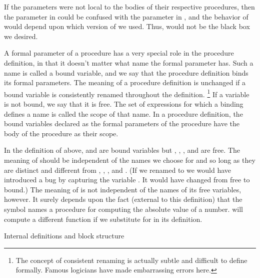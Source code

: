 If the parameters were not local to the bodies of their respective procedures,
then the parameter  in  could be confused with the parameter  in ,
and the behavior of  would depend upon which version of  we used.
Thus,  would not be the black box we desired.

A formal parameter of a procedure has a very special role in the procedure definition,
in that it doesn't matter what name the formal parameter has.
Such a name is called a bound variable, and we say that the procedure definition binds its formal parameters.
The meaning of a procedure definition is unchanged
if a bound variable is consistently renamed throughout the definition.
\footnote{%
   The concept of consistent renaming is actually subtle and difficult to define formally.
   Famous logicians have made embarrassing errors here.
}
If a variable is not bound, we say that it is free.
The set of expressions for which a binding defines a name is called the scope of that name.
In a procedure definition,
the bound variables declared as the formal parameters of the procedure
have the body of the procedure as their scope.

In the definition of  above,
 and  are bound variables but \exp{<}, \exp{-}, , and  are free.
The meaning of  should be independent of the names we choose for  and 
so long as they are distinct and different from \exp{<}, \exp{-}, , and .
(If we renamed  to  we would have introduced a bug by capturing the variable .
It would have changed from free to bound.)
The meaning of  is not independent of the names of its free variables, however.
It surely depends upon the fact (external to this definition)
that the symbol  names a procedure for computing the absolute value of a number.
 will compute a different function if we substitute  for  in its definition.

Internal definitions and block structure

